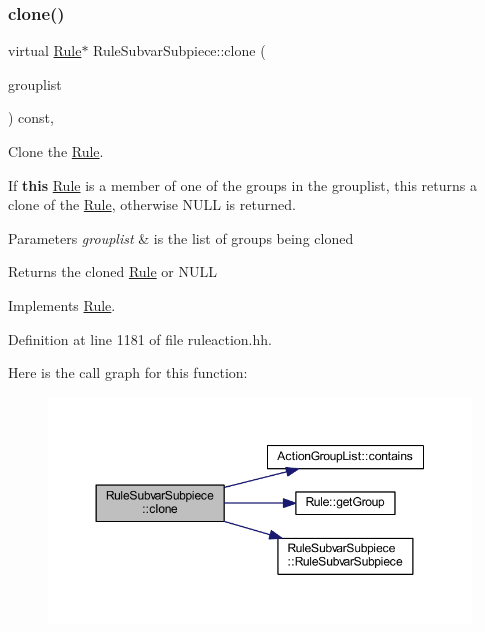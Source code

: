 \subsubsection{\texorpdfstring{clone()}{clone()}}
{\footnotesize\ttfamily virtual \mbox{\hyperlink{class_rule}{Rule}}$\ast$ Rule\+Subvar\+Subpiece\+::clone (\begin{DoxyParamCaption}\item[{const \mbox{\hyperlink{class_action_group_list}{Action\+Group\+List}} \&}]{grouplist }\end{DoxyParamCaption}) const\hspace{0.3cm}{\ttfamily [inline]}, {\ttfamily [virtual]}}



Clone the \mbox{\hyperlink{class_rule}{Rule}}. 

If {\bfseries{this}} \mbox{\hyperlink{class_rule}{Rule}} is a member of one of the groups in the grouplist, this returns a clone of the \mbox{\hyperlink{class_rule}{Rule}}, otherwise N\+U\+LL is returned. 
\begin{DoxyParams}{Parameters}
{\em grouplist} & is the list of groups being cloned \\
\hline
\end{DoxyParams}
\begin{DoxyReturn}{Returns}
the cloned \mbox{\hyperlink{class_rule}{Rule}} or N\+U\+LL 
\end{DoxyReturn}


Implements \mbox{\hyperlink{class_rule_a70de90a76461bfa7ea0b575ce3c11e4d}{Rule}}.



Definition at line 1181 of file ruleaction.\+hh.

Here is the call graph for this function\+:
\nopagebreak
\begin{figure}[H]
\begin{center}
\leavevmode
\includegraphics[width=350pt]{class_rule_subvar_subpiece_aa771738e5e43bb05d600b22b7a6e191b_cgraph}
\end{center}
\end{figure}
\mbox{\label{class_rule_subvar_subpiece_a47aab430f3689d7fa4292ba78f8a799d}} 

